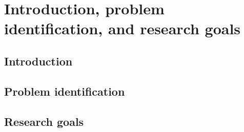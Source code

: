 \chapter{Introduction, problem identification, and research goals}

\clearpage

\section{Introduction}


\section{Problem identification}

\section{Research goals}